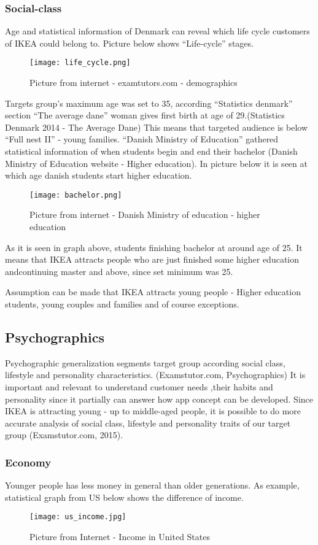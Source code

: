 \subsubsection{Social-class}
Age and statistical information of Denmark can reveal which life cycle customers of IKEA could belong to. Picture below shows  “Life-cycle” stages.
\begin{figure}[H]
\centering
\texttt{[image: life\_cycle.png]}
\caption{Picture from internet -  examtutors.com - demographics}
\end{figure}
Targets group’s maximum age was set to 35, according “Statistics denmark” section “The average dane” woman gives first birth at age of 29.(Statistics Denmark 2014 - The Average Dane) This means that targeted audience is below “Full nest II” - young families. 
 “Danish Ministry of Education” gathered statistical information of when students begin and end their bachelor (Danish Ministry of Education website - Higher education). In picture below it is seen at which age danish students start higher education.
\begin{figure}[H]
\centering
\texttt{[image: bachelor.png]}
\caption{Picture from internet - Danish Ministry of education - higher education}
\end{figure}
As it is seen in graph above, students finishing bachelor at around age of 25. It means that IKEA attracts people who are just finished some higher education and\or continuing master and above, since set minimum was 25.

Assumption can be made that IKEA attracts young people - Higher education students, young couples and families and of course exceptions.

\subsection{Psychographics}
Psychographic generalization segments target group according social class, lifestyle and personality characteristics. (Examstutor.com, Psychographics) It is important and relevant to understand customer needs ,their habits and personality since it partially can answer how app concept can be developed. 
Since IKEA is attracting young - up to middle-aged people, it is possible to do more accurate analysis of social class, lifestyle and personality traits of our target group (Examstutor.com,  2015). 
\subsubsection{Economy}
Younger people has less money in general than older generations. As example, statistical graph from US below shows the difference of income.
\begin{figure}[H]
\centering
\texttt{[image: us\_income.jpg]}
\caption{Picture from Internet - Income in United States}
\end{figure}

